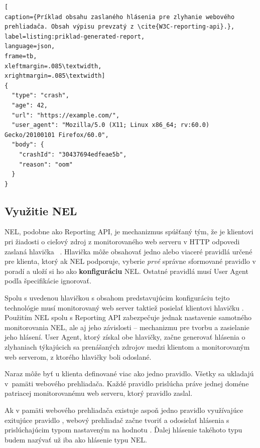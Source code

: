 \begin{center}
\centering
\begin{lstlisting}[
caption={Príklad obsahu zaslaného hlásenia pre zlyhanie webového prehliadača. Obsah výpisu prevzatý z \cite{W3C-reporting-api}.},
label=listing:priklad-generated-report, 
language=json, 
frame=tb,
xleftmargin=.085\textwidth, 
xrightmargin=.085\textwidth]
{
  "type": "crash",
  "age": 42,
  "url": "https://example.com/",
  "user_agent": "Mozilla/5.0 (X11; Linux x86_64; rv:60.0) Gecko/20100101 Firefox/60.0",
  "body": {
    "crashId": "30437694edfeae5b",
    "reason": "oom"
  }
}
\end{lstlisting}
\end{center}



\subsection{Využitie NEL}
\label{network-error-logging-spec}

NEL, podobne ako Reporting API, je mechanizmus spúšťaný tým, že je klientovi pri žiadosti o cieľový zdroj z monitorovaného web serveru v HTTP odpovedi zaslaná hlavička \mbox{ \cite{W3C-NEL}}.
Hlavička  môže obsahovať jedno alebo viaceré pravidlá určené pre klienta, ktorý ak NEL podporuje, vyberie \textit{prvé} správne sformované pravidlo v poradí a uloží si ho ako \textbf{konfiguráciu} NEL.
Ostatné pravidlá musí User Agent podľa špecifikácie ignorovať.

Spolu s uvedenou hlavičkou s obsahom predstavujúcim konfiguráciu tejto technológie musí monitorovaný web server taktiež posielať klientovi hlavičku . 
Použitím NEL spolu s Reporting API zabezpečuje jednak nastavenie samotného monitorovania NEL, ale aj jeho závislosti -- mechanizmu pre tvorbu a zasielanie jeho hlásení.
User Agent, ktorý získal obe hlavičky, začne generovať hlásenia o zlyhaniach týkajúcich sa prenášaných zdrojov medzi klientom a monitorovaným web serverom, z ktorého hlavičky boli odoslané. 

Naraz môže byť u klienta definované viac ako jedno pravidlo.
Všetky sa ukladajú \mbox{v pamäti} webového prehliadača.
Každé pravidlo prislúcha práve jednej doméne patriacej monitorovanému web serveru, ktorý pravidlo zaslal. 

Ak v pamäti webového prehliadača existuje aspoň jedno pravidlo  využívajúce exitujúce pravidlo , 
webový prehliadač začne tvoriť a odosielať hlásenia s prislúchajúcim typom nastaveným na hodnotu . 
Ďalej hlásenie takéhoto typu budem nazývať už iba ako hlásenie typu NEL.

